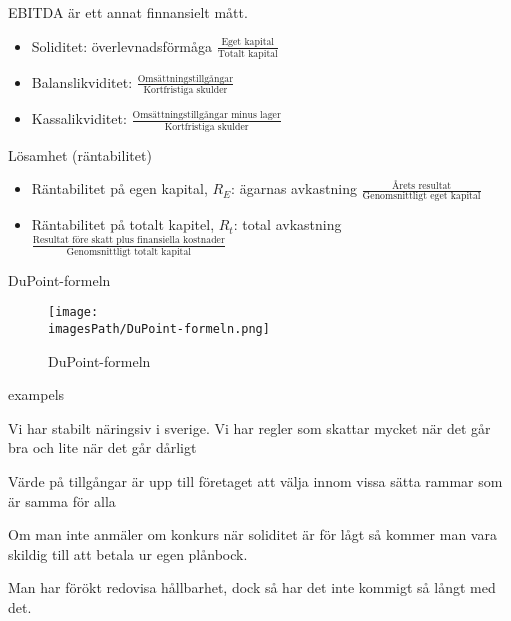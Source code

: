 \documentclass{article}
\newcommand{\imagesPath}{images}
\begin{document}
EBITDA är ett annat finnansielt mått.

\begin{itemize} %
    \item Soliditet: överlevnadsförmåga \newline
    $\frac{\text{Eget kapital}}{\text{Totalt kapital}}$
    \item Balanslikviditet: \newline 
    $\frac{\text{Omsättningstillgångar}}{\text{Kortfristiga skulder}}$
    \item Kassalikviditet: \newline
    $\frac{\text{Omsättningstillgångar minus lager}}{\text{Kortfristiga skulder}}$
\end{itemize}

Lösamhet (räntabilitet)
\begin{itemize}
    \item Räntabilitet på egen kapital, $R_E$: ägarnas avkastning \newline
    $\frac{\text{Årets resultat}}{\text{Genomsnittligt eget kapital}}$
    \item Räntabilitet på totalt kapitel, $R_t$: total avkastning \newline
    $\frac{\text{Resultat före skatt plus finansiella kostnader}}{\text{Genomsnittligt totalt kapital}}$
\end{itemize}

DuPoint-formeln
\begin{figure}[!h]
    \centering
    \texttt{[image: \\imagesPath/DuPoint-formeln.png]}
    \caption{DuPoint-formeln}
\end{figure}

exampels %


Vi har stabilt näringsiv i sverige. Vi har regler som skattar mycket när det går bra 
och lite när det går dårligt 

Värde på tillgångar är upp till företaget att välja innom vissa sätta rammar som är samma för alla

Om man inte anmäler om konkurs när soliditet är för lågt så kommer man vara skildig till 
att betala ur egen plånbock. 


Man har förökt redovisa hållbarhet, dock så har det inte kommigt så långt med det.
\end{document}
